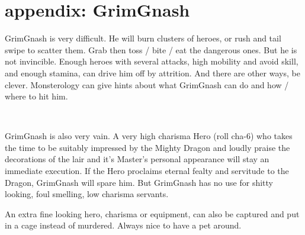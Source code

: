 































\clearpage
\raggedbottom
\section*{appendix: GrimGnash}
\label{appendixgrimgnash}

GrimGnash is very difficult. He will burn clusters of heroes, or rush and tail swipe to scatter them. Grab then toss / bite / eat the dangerous ones. But he is not invincible. Enough heroes with several attacks, high mobility and avoid skill, and enough stamina, can drive him off by attrition. And there are other ways, be clever. Monsterology can give hints about what GrimGnash can do and how / where to hit him.

\

GrimGnash is also very vain. A very high charisma Hero (roll cha-6) who takes the time to be suitably impressed by the Mighty Dragon and loudly praise the decorations of the lair and it's Master's personal appearance will stay an immediate execution. If the Hero proclaims eternal fealty and servitude to the Dragon, GrimGnash will spare him. But GrimGnash has no use for shitty looking, foul smelling, low charisma servants.

An extra fine looking hero, charisma or equipment, can also be captured and put in a cage instead of murdered. Always nice to have a pet around.

\

